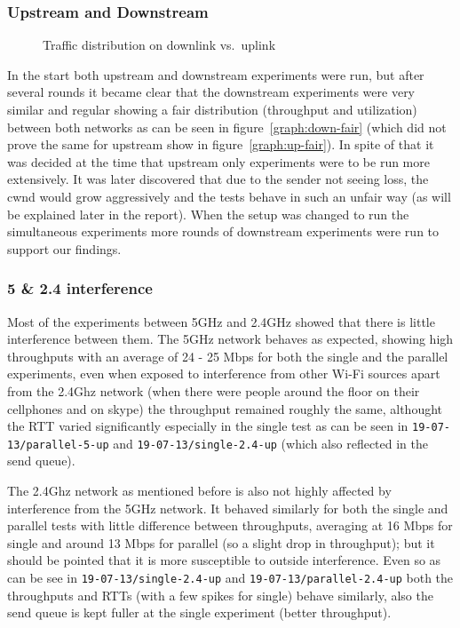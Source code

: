 \documentclass[12pt,a4paper]{article}
\begin{document}
\subsubsection{Upstream and Downstream}

\begin{figure}[h]
 \centering
 \subfloat[][downlink] {\
   \scalebox{0.55}{}\label{graph:down-fair}
 }
 \subfloat[][uplink] {\
   \scalebox{0.55}{}\label{graph:up-fair}
 }

 \caption{Traffic distribution on downlink vs.\ uplink}\label{graph:interference}
\end{figure}

In the start both upstream and downstream experiments were run, but after
several rounds it became clear that the downstream experiments were very similar
and regular showing a fair distribution (throughput and utilization) between
both networks as can be seen in figure~\ref{graph:down-fair} (which did not
prove the same for upstream show in figure~\ref{graph:up-fair}). In spite of
that it was decided at the time that upstream only experiments were to be run
more extensively. It was later discovered that due to the sender not seeing
loss, the cwnd would grow aggressively and the tests behave in such an unfair
way (as will be explained later in the report). When the setup was changed to
run the simultaneous experiments more rounds of downstream experiments were run
to support our findings.

\subsubsection{5 \& 2.4 interference}
Most of the experiments between 5GHz and 2.4GHz showed that there is little
interference between them. The 5GHz network behaves as expected, showing high
throughputs with an average of 24 - 25 Mbps  for both the single and the
parallel experiments, even when exposed to interference from other Wi-Fi sources
apart from the 2.4Ghz network (when there were people around the floor on their
cellphones and on skype) the throughput remained roughly the same, althought the
RTT varied significantly especially in the single test as can be seen in
\texttt{19-07-13/parallel-5-up} and \texttt{19-07-13/single-2.4-up} (which also
reflected in the send queue).

The 2.4Ghz network as mentioned before is also not highly affected by
interference from the 5GHz network. It behaved similarly for both the single and
parallel tests with little difference between throughputs, averaging at 16 Mbps
for single and around 13 Mbps for parallel (so a slight drop in throughput); but
it should be pointed that it is more susceptible to outside interference. Even
so as can be see in \texttt{19-07-13/single-2.4-up} and
\texttt{19-07-13/parallel-2.4-up} both the throughputs and RTTs (with a few
spikes for single) behave similarly, also the send queue is kept fuller at the
single experiment (better throughput).
\end{document}
